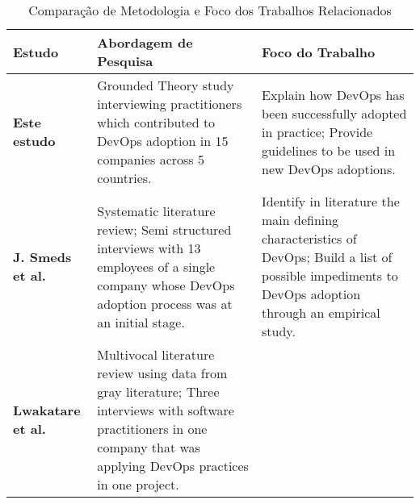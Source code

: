 {%

\begin{table}[hb!]
\centering
\caption{Comparação de Metodologia e Foco dos Trabalhos Relacionados}
\label{related_work_table}
\begin{tabular}{|p{3cm}|p{6cm}|p{6cm}|}
\hline

\textbf{Estudo}
& \textbf{Abordagem de Pesquisa}
& \textbf{Foco do Trabalho} \\

\hline

\textbf{Este estudo}

& Grounded Theory study interviewing practitioners which contributed to DevOps
adoption in 15 companies across 5 countries.

& Explain how DevOps has been successfully adopted in practice;\newline
\newline Provide guidelines to be used in new DevOps adoptions. \\

\hline

\textbf{J. Smeds et al.~\cite{devops_a_definition}}

& Systematic literature review; \newline \newline Semi structured interviews
with 13 employees of a single company whose DevOps adoption process was at
an initial stage.

& Identify in literature the main defining characteristics of DevOps; \newline
\newline Build a list of possible impediments to DevOps adoption through an
empirical study. \\

\hline

\textbf{Lwakatare et al.~\cite{extending_dimensions}}

&
Multivocal literature review using data from gray literature; \newline \newline
Three interviews with software practitioners in one company that was applying
DevOps practices in one project.


\end{tabular}
\end{table}}
